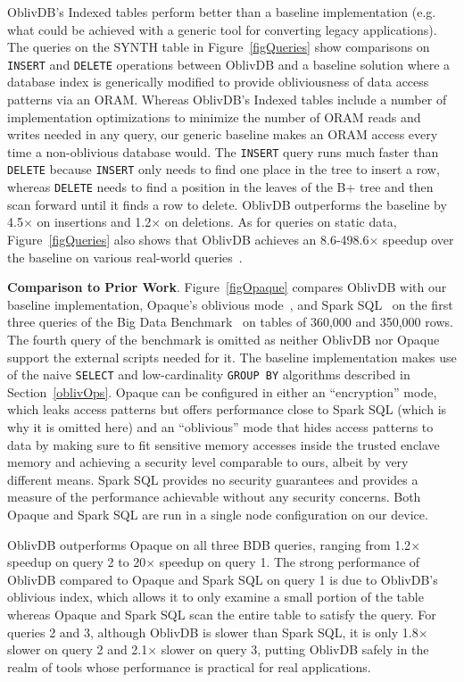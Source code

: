 \documentclass[letterpaper,twocolumn,10pt]{article}
\def\name/{OblivDB}
\begin{document}
\name/'s Indexed tables perform better than a baseline implementation (e.g. what could be achieved with a generic tool for converting legacy applications). The queries on the SYNTH table in Figure~\ref{figQueries} show comparisons on \texttt{INSERT} and \texttt{DELETE} operations between \name/ and a baseline solution where a database index is generically modified to provide obliviousness of data access patterns via an ORAM. Whereas \name/'s Indexed tables include a number of implementation optimizations to minimize the number of ORAM reads and writes needed in any query, our generic baseline makes an ORAM access every time a non-oblivious database would. The \texttt{INSERT} query runs much faster than \texttt{DELETE} because \texttt{INSERT} only needs to find one place in the tree to insert a row, whereas \texttt{DELETE} needs to find a position in the leaves of the B+ tree and then scan forward until it finds a row to delete. \name/ outperforms the baseline by 4.5$\times$ on insertions and 1.2$\times$ on deletions. As for queries on static data, Figure~\ref{figQueries} also shows that \name/ achieves an 8.6-498.6$\times$ speedup over the baseline on various real-world queries~\cite{BDB, NASDAQ, FLIGHT, CFPB}.

  \noindent \textbf{Comparison to Prior Work}. 
Figure~\ref{figOpaque} compares \name/ with our baseline implementation, Opaque's oblivious mode~\cite{ZDB+17}, and Spark SQL~\cite{SparkSQL} on the first three queries of the Big Data Benchmark~\cite{BDB} on tables of 360,000 and 350,000 rows. The fourth query of the benchmark is omitted as neither \name/ nor Opaque support the external scripts needed for it. The baseline implementation makes use of the naive \texttt{SELECT} and low-cardinality \texttt{GROUP BY} algorithms described in Section~\ref{oblivOps}. Opaque can be configured in either an ``encryption'' mode, which leaks access patterns but offers performance close to Spark SQL (which is why it is omitted here) and an ``oblivious'' mode that hides access patterns to data by making sure to fit sensitive memory accesses inside the trusted enclave memory and achieving a security level comparable to ours, albeit by very different means. Spark SQL provides no security guarantees and provides a measure of the performance achievable without any security concerns. Both Opaque and Spark SQL are run in a single node configuration on our device. 

\name/ outperforms Opaque on all three BDB queries, ranging from 1.2$\times$ speedup on query 2 to 20$\times$ speedup on query 1. The strong performance of \name/ compared to Opaque and Spark SQL on query 1 is due to \name/'s oblivious index, which allows it to only examine a small portion of the table whereas Opaque and Spark SQL scan the entire table to satisfy the query. For queries 2 and 3, although \name/ is slower than Spark SQL, it is only 1.8$\times$ slower on query 2 and 2.1$\times$ slower on query 3, putting \name/ safely in the realm of tools whose performance is practical for real applications. 
\end{document}
